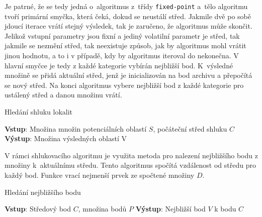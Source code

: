 \noindent
Je patrné, že se tedy jedná o~algoritmus z~třídy \texttt{fixed-point} a~tělo algoritmu tvoří primární smyčka, která čeká, dokud se neustálí střed. Jakmile dvě po sobě jdoucí iterace vrátí stejný výsledek, tak je zaručeno, že algoritmus může skončit. Jelikož vstupní parametry jsou fixní a jediný volatilní parametr je střed, tak jakmile se nezmění střed, tak neexistuje způsob, jak by algoritmus mohl vrátit jinou hodnotu, a to i v případě, kdy by algoritmus iteroval do nekonečna. V hlavní smyčce je tedy z každé kategorie vybírán nejbližší bod. K~výsledné množině se přidá aktuální střed, jenž je inicializován na bod archivu a přepočítá se nový střed. Na konci algoritmus vybere nejbližší bod z každé kategorie pro ustálený střed a danou množinu vrátí.
\begin{algorithm}
\caption{Hledání shluku lokalit}
\begin{algorithmic}[1]
        \State \textbf{Vstup}: Množina množin potenciálních oblastí $S$, počáteční střed shluku $C$
        \State \textbf{Výstup}: Množina výsledných oblastí V
        \Repeat
    
            
        
        
    \EndFunction
\end{algorithmic}
\end{algorithm}
\newpara
V rámci shlukovacího algoritmu je využita metoda pro nalezení nejbližšího bodu z množiny k~aktuálnímu středu. Tento algoritmus spočítá vzdálenost od středu pro každý bod. Funkce vrací nejmenší prvek ze spočtené množiny $D$.

\begin{algorithm}
\caption{Hledání nejbližšího bodu}
\begin{algorithmic}[1]
    \State \textbf{Vstup}: Středový bod $C$, množina bodů $P$
    \State \textbf{Výstup}: Nejbližší bod $V$ k bodu $C$
    
\EndFunction
\end{algorithmic}
\end{algorithm}

